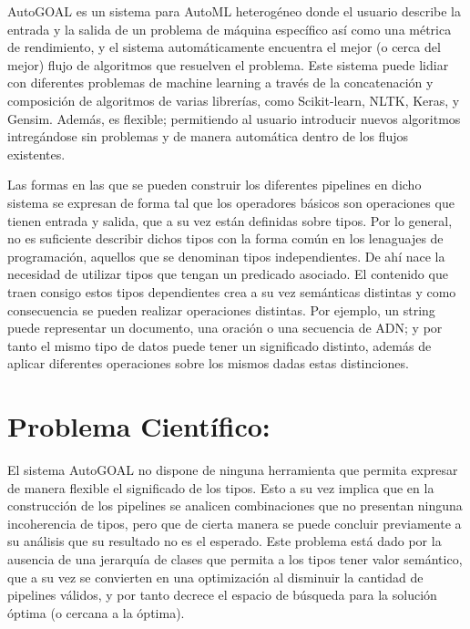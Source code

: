 
AutoGOAL es un sistema para AutoML heterogéneo donde el usuario describe la entrada y la salida de un problema de máquina específico así como una métrica de rendimiento, y el sistema automáticamente encuentra el mejor (o cerca del mejor) flujo de algoritmos que resuelven el problema. Este sistema puede lidiar
con diferentes problemas de machine learning a través de la concatenación y composición de algoritmos de varias librerías, como Scikit-learn, NLTK, Keras, y Gensim. Además, es flexible; permitiendo al usuario introducir nuevos algoritmos intregándose sin problemas y de manera automática dentro de los flujos existentes. \vspace{0.25cm}


Las formas en las que se pueden construir los diferentes pipelines en dicho sistema se expresan de forma tal que los operadores básicos son operaciones que tienen entrada y salida, que a su vez están definidas sobre tipos. Por lo general, no es suficiente describir dichos tipos con la forma común en los lenaguajes de programación, aquellos que se denominan tipos independientes. De ahí nace la necesidad de utilizar tipos que tengan un predicado asociado. El contenido que traen consigo estos tipos dependientes crea a su vez semánticas distintas y como consecuencia se pueden realizar operaciones distintas. Por ejemplo, un string puede representar un documento, una oración o una secuencia de ADN; y por tanto el mismo tipo de datos puede tener un significado distinto, además de aplicar diferentes operaciones sobre los mismos dadas estas distinciones. \vspace{0.25cm}


\section{Problema Científico:}

El sistema AutoGOAL no dispone de ninguna herramienta que permita expresar de manera flexible el significado de los tipos. Esto a su vez implica que en la construcción de los pipelines se analicen combinaciones que no presentan ninguna incoherencia de tipos, pero que  de cierta manera se puede concluir previamente a su análisis que su resultado no es el esperado. Este problema está dado por la ausencia de una jerarquía de clases que permita a los tipos tener valor semántico, que a su vez se convierten en una optimización al disminuir la cantidad de pipelines válidos, y por tanto decrece el espacio de búsqueda para la solución óptima (o cercana a la óptima).\vspace{0.25cm}


